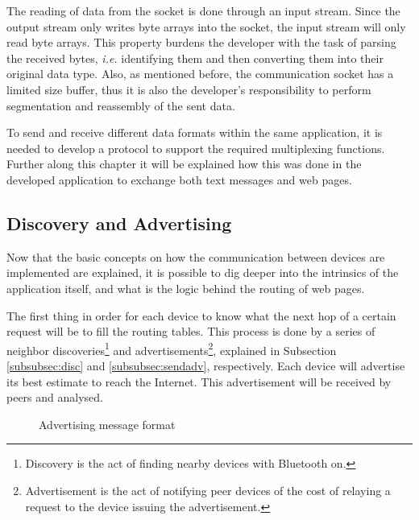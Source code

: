 The reading of data from the socket is done through an input stream. Since the output stream only writes byte arrays into the socket, the input stream will only read byte arrays. This property burdens the developer with the task of parsing the received bytes, \textit{i.e.} identifying them and then converting them into their original data type. Also, as mentioned before, the communication socket has a limited size buffer, thus it is also the developer's responsibility to perform segmentation and reassembly of the sent data.

To send and receive different data formats within the same application, it is needed to develop a protocol to support the required multiplexing functions. Further along this chapter it will be explained how this was done in the developed application to exchange both text messages and web pages.

\subsection{Discovery and Advertising}
\label{subsec:disandadv}

Now that the basic concepts on how the communication between devices are implemented are explained, it is possible to dig deeper into the intrinsics of the application itself, and what is the logic behind the routing of web pages.

The first thing in order for each device to know what the next hop of a certain request will be to fill the routing tables. This process is done by a series of neighbor discoveries\footnote{Discovery is the act of finding nearby devices with Bluetooth on.} and advertisements\footnote{Advertisement is the act of notifying peer devices of the cost of relaying a request to the device issuing the advertisement.}, explained in Subsection \ref{subsubsec:disc} and \ref{subsubsec:sendadv}, respectively. Each device will advertise its best estimate to reach the Internet. This advertisement will be received by peers and analysed.

\begin{figure}[ht]
   \noindent{}
	\caption{\label{fig:advmsg} Advertising message format}
\end{figure}

